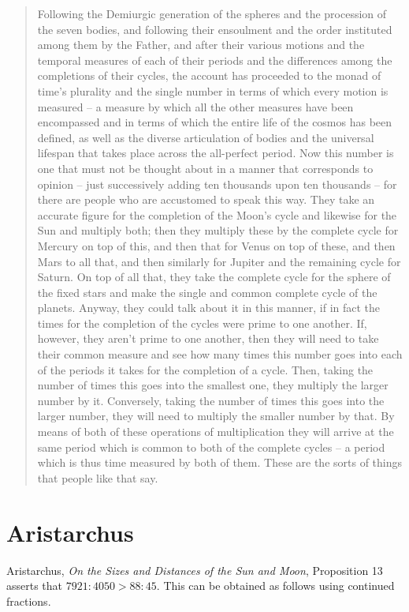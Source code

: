 \documentclass{article}
\begin{document}
\begin{quote}
Following the Demiurgic generation of the spheres and
the procession of the seven bodies, and following their ensoulment and
the order instituted among them by the Father, and after their various motions and the temporal measures of each of their periods and the differences among the
completions of their cycles, the account has proceeded to the monad of time's plurality and the single number in terms
of which every motion is measured -- a measure by which all the other measures have been encompassed and in terms of which the entire life of the cosmos has been defined,
as well as the diverse articulation of
bodies and the universal lifespan  that takes place across the all-perfect period. Now this number is one that must not be thought
about in a manner that corresponds to opinion -- just successively
adding ten thousands upon ten thousands -- for there are people who
are accustomed to speak this way. They take an accurate figure for the completion of the Moon's cycle and likewise for the Sun and multiply  both; then they multiply these by
the complete cycle for Mercury on
top of this, and then that for Venus on top of these, and then Mars to
all that, and then similarly for Jupiter and the remaining cycle for Saturn. On top of all that, they take the complete cycle for the sphere of
the fixed stars and make the single and common complete cycle of the planets. Anyway, they could talk about it in this manner, if in fact the
times for the completion of the cycles were prime to one another. If, however, they aren't prime to one another, then they will need to take their common measure
and see how many times this number goes into each of the periods it takes for the completion of
 a cycle. Then, taking the number of times this goes into the smallest one, they multiply the larger number by it. Conversely, taking the number of times this goes into the
larger number, they will need to multiply the smaller number by that. By means of both of these operations of multiplication they will arrive at the same period which is common
to both of the complete cycles -- a period which is thus time
measured by both of them. These are the sorts of things that people like that say.
\end{quote}




\section{Aristarchus}
Aristarchus, {\em On the Sizes and Distances of the Sun and Moon}, 
Proposition 13 \cite[p.~397]{aristarchus} asserts that $7921:4050>88:45$. This can be obtained  as follows using continued fractions.
\end{document}
